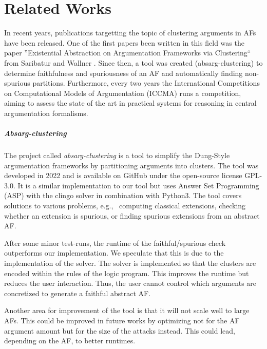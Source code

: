 \chapter{Related Works}
In recent years, publications targetting the topic of clustering arguments in AFs have been released. One of the first papers been written in this field was the paper ''Existential Abstraction on Argumentation Frameworks via Clustering`` from Saribatur and Wallner \cite{DBLP:conf/kr/SaribaturW21}. Since then, a tool was created (absarg-clustering)\cite{GitHub:repoRelatedTool} to determine faithfulness and spuriousness of an AF and automatically finding non-spurious partitions. Furthermore, every two years the International Competitions on Computational Models of Argumentation (ICCMA) \cite{COMP:ICCMA2023} runs a competition, aiming to assess the state of the art in practical systems for reasoning in central argumentation formalisms.

\paragraph{Absarg-clustering} The project called \emph{absarg-clustering} \cite{GitHub:repoRelatedTool} is a tool to simplify the Dung-Style argumentation frameworks by partitioning arguments into clusters. The tool was developed in 2022 and is available on GitHub under the open-source license GPL-3.0. It is a similar implementation to our tool but uses Answer Set Programming (ASP) with the clingo solver \cite{gebser_et_al:OASIcs.ICLP.2016.2} in combination with Python3. The tool covers solutions to various problems, e.g., \ computing classical extensions, checking whether an extension is spurious, or finding spurious extensions from an abstract AF.

After some minor test-runs, the runtime of the faithful/spurious check outperforms our implementation. We speculate that this is due to the implementation of the solver. The solver is implemented so that the clusters are encoded within the rules of the logic program. This improves the runtime but reduces the user interaction. Thus, the user cannot control which arguments are concretized to generate a faithful abstract AF.

Another area for improvement of the tool is that it will not scale well to large AFs. This could be improved in future works by optimizing not for the AF argument amount but for the size of the attacks instead. This could lead, depending on the AF, to better runtimes.

